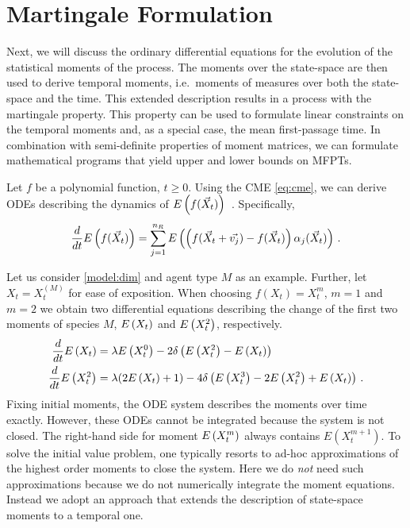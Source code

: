 \section{Martingale Formulation}\label{sec:mfpt:moments}
Next, we will discuss the ordinary differential equations for the evolution of the statistical moments of
the process.
The moments over the state-space are then used to derive temporal moments, i.e.\ moments
of measures over both the state-space and the time.
This extended description results in a process with the martingale property.
This property can be used to formulate linear constraints on the temporal moments
and, as a special case, the mean first-passage time.
In combination with semi-definite properties of moment matrices, we can formulate
mathematical programs that yield upper and lower bounds on \aclp{MFPT}.


Let $f$ be a polynomial function, $t\ge0$.
Using the \ac{CME} \eqref{eq:cme}, we can derive \acp{ODE}
describing the dynamics of ${E}\left(f(\vec{X}_t)\right)$~\cite{engblom2006computing}.
Specifically,
\begin{equation}\label{eq:mfpt:mom_ode}
    \frac{d}{dt}{E}\left(f(\vec X_t)\right) = \sum_{j=1}^{n_R}{E}\left(\left(f({\vec X_t +
    \vec{v_j}}) - f(\vec X_t)\right)\alpha_j(\vec X_t)\right)\,.
\end{equation}

Let us consider \autoref{model:dim} and agent type $M$ as an example.
Further, let $X_t=X_t^{(M)}$
for ease of exposition.
When choosing $f(X_t)=X_t^m$, $m=1$ and   $m=2$
we obtain two differential equations describing
the change of the first two moments of species $M$,
${E}\left(X_t\right)$ and ${E}\left(X_t^2\right)$, respectively.
\begin{equation}\label{eq:dim_exp_ode}
	\begin{split}
    \frac{d}{dt}{E}\left({X}_t\right) &= \lambda{E}\left({X}_t^0\right) -
    2{\delta}\left({E}\left({X}_t^2\right)-{E}\left({X}_t\right)\right)\\
    \frac{d}{dt}{E}\left({X}_t^2\right) &= \lambda(2{E}\left({X}_t\right) + 1) - 4\delta\left({E}\left({X}_t^3\right) -
    2{E}\left({X}_t^2\right) + {E}\left({X}_t\right)\right)\,.
	\end{split}
\end{equation}
Fixing initial moments, the \ac{ODE} system describes the moments over time exactly.
However, these \acp{ODE} cannot be integrated because the system is not closed.
The right-hand side for moment ${E}\left(X_t^m\right)$ always contains $E(X_t^{m+1})$.
To solve the initial value problem,
one typically resorts to ad-hoc approximations of the highest order moments
to close the system. Here we do \emph{not} need such approximations
because we do not numerically integrate the moment equations.
Instead we adopt an approach \cite{dowdy2018dynamic,sakurai2019bounding} that extends
the description of state-space moments to a temporal one.

